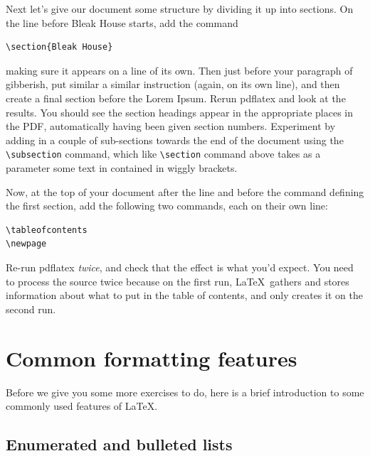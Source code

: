 \begin{refsection}
Next let's give our document some structure by dividing it up into sections. On the line before Bleak House starts, add the command

\begin{verbatim}
\section{Bleak House}
\end{verbatim}
%
making sure it appears on a line of its own. Then just before your paragraph of gibberish, put similar a similar instruction (again, on its own line), and then create a final section before the Lorem Ipsum. Rerun pdflatex and look at the results. You should see the section headings appear in the appropriate places in the PDF, automatically having been given section numbers. Experiment by adding in a couple of sub-sections towards the end of the document using the  \verb|\subsection| command, which like \verb|\section| command above takes as a parameter some text in contained in wiggly brackets. 

Now, at the top of your document after the \verb|| line and before the command defining the first section, add the following two commands, each on their own line:

\begin{verbatim}
\tableofcontents
\newpage
\end{verbatim}
%
  Re-run pdflatex \emph{twice}, and check that the effect is what you'd expect. You need to process the source twice because on the first run, \LaTeX\ gathers and stores information about what to put in the table of contents, and only creates it on the second run.


\section{Common formatting features}

Before we give you some more exercises to do, here is a brief introduction to some commonly used features of \LaTeX.

\subsection{Enumerated and bulleted lists}


\end{refsection}
